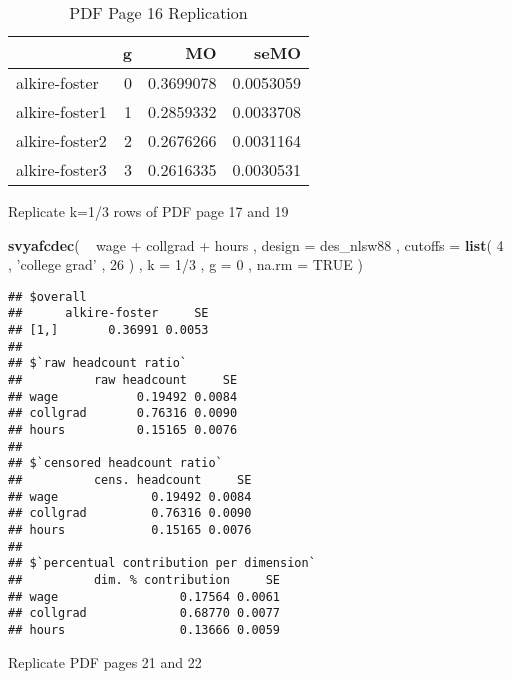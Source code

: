 \documentclass[]{book}
\newenvironment{Shaded}{\begin{snugshade}}{\end{snugshade}}
\newcommand{\KeywordTok}[1]{\textcolor[rgb]{0.13,0.29,0.53}{\textbf{{#1}}}}
\newcommand{\DataTypeTok}[1]{\textcolor[rgb]{0.13,0.29,0.53}{{#1}}}
\newcommand{\DecValTok}[1]{\textcolor[rgb]{0.00,0.00,0.81}{{#1}}}
\newcommand{\StringTok}[1]{\textcolor[rgb]{0.31,0.60,0.02}{{#1}}}
\newcommand{\OtherTok}[1]{\textcolor[rgb]{0.56,0.35,0.01}{{#1}}}
\newcommand{\NormalTok}[1]{{#1}}
\begin{document}
\begin{table}

\caption{\label{tab:unnamed-chunk-46}PDF Page 16 Replication}
\centering
\begin{tabular}[t]{lrrr}
\toprule
  & g & MO & seMO\\
\midrule
alkire-foster & 0 & 0.3699078 & 0.0053059\\
alkire-foster1 & 1 & 0.2859332 & 0.0033708\\
alkire-foster2 & 2 & 0.2676266 & 0.0031164\\
alkire-foster3 & 3 & 0.2616335 & 0.0030531\\
\bottomrule
\end{tabular}
\end{table}

Replicate k=1/3 rows of PDF page 17 and 19

\begin{Shaded}
\begin{Highlighting}[]
\KeywordTok{svyafcdec}\NormalTok{(}
    \NormalTok{~}\StringTok{ }\NormalTok{wage +}\StringTok{ }\NormalTok{collgrad +}\StringTok{ }\NormalTok{hours , }
    \DataTypeTok{design =} \NormalTok{des_nlsw88 , }
    \DataTypeTok{cutoffs =} \KeywordTok{list}\NormalTok{( }\DecValTok{4} \NormalTok{, }\StringTok{'college grad'} \NormalTok{, }\DecValTok{26} \NormalTok{) , }
    \DataTypeTok{k =} \DecValTok{1}\NormalTok{/}\DecValTok{3} \NormalTok{, }
    \DataTypeTok{g =} \DecValTok{0} \NormalTok{,}
    \DataTypeTok{na.rm =} \OtherTok{TRUE}
\NormalTok{)}
\end{Highlighting}
\end{Shaded}

\begin{verbatim}
## $overall
##      alkire-foster     SE
## [1,]       0.36991 0.0053
## 
## $`raw headcount ratio`
##          raw headcount     SE
## wage           0.19492 0.0084
## collgrad       0.76316 0.0090
## hours          0.15165 0.0076
## 
## $`censored headcount ratio`
##          cens. headcount     SE
## wage             0.19492 0.0084
## collgrad         0.76316 0.0090
## hours            0.15165 0.0076
## 
## $`percentual contribution per dimension`
##          dim. % contribution     SE
## wage                 0.17564 0.0061
## collgrad             0.68770 0.0077
## hours                0.13666 0.0059
\end{verbatim}

Replicate PDF pages 21 and 22
\end{document}
